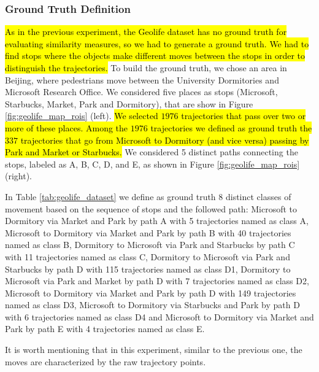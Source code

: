 \documentclass[12pt]{article}
\begin{document}
\subsubsection{Ground Truth Definition}
\hl{As in the previous experiment, the Geolife dataset has no ground truth for evaluating similarity measures, so we had to generate a ground truth. We had to find stops where the objects make different moves between the stops in order to distinguish the trajectories.}
To build the ground truth, we chose an area in Beijing, where pedestrians move between the University Dormitories and Microsoft Research Office. We considered five places as stops (Microsoft, Starbucks, Market, Park and Dormitory), that are show in Figure \ref{fig:geolife_map_rois} (left). \hl{We selected $1976$ trajectories that pass over two or more of these places. Among the $1976$ trajectories we defined as ground truth the $337$ trajectories that go from Microsoft to Dormitory (and vice versa) passing by Park and Market or Starbucks.} We considered 5 distinct paths connecting the stops, labeled as A, B, C, D, and E, as shown in Figure \ref{fig:geolife_map_rois} (right).

In Table \ref{tab:geolife_dataset} we define as ground truth 8 distinct classes of movement based on the sequence of stops and the followed path: Microsoft to Dormitory via Market and Park by path A with 5 trajectories named as class A, Microsoft to Dormitory via Market and Park by path B with 40 trajectories named as class B, Dormitory to Microsoft via Park and Starbucks by path C with 11 trajectories named as class C, Dormitory to Microsoft via Park and Starbucks by path D with 115 trajectories named as class D1, Dormitory to Microsoft via Park and Market by path D with 7 trajectories named as class D2, Microsoft to Dormitory via Market and Park by path D with 149 trajectories named as class D3, Microsoft to Dormitory via Starbucks and Park by path D with 6 trajectories named as class D4 and Microsoft to Dormitory via Market and Park by path E with 4 trajectories named as class E.

It is worth mentioning that in this experiment, similar to the previous one, the moves are characterized by the raw trajectory points.
\end{document}
